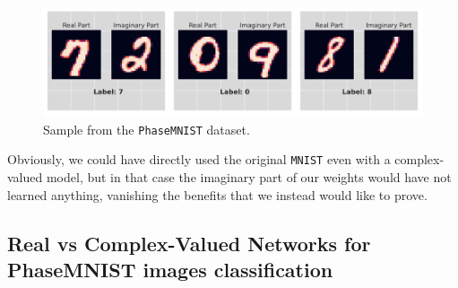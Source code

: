 \documentclass[../main.tex]{subfiles}
\begin{document}
\begin{figure}[!ht]
	\centering
	\includegraphics[width=\textwidth]{pictures/phasemnist_example}
	\caption{Sample from the \texttt{PhaseMNIST} dataset.}
	\label{fig:phasemnist_example}
\end{figure}
Obviously, we could have directly used the original \texttt{MNIST} even with a complex-valued model, but in that case the imaginary part of our weights would have not learned anything, vanishing the benefits that we instead would like to prove.


\subsection*{Real vs Complex-Valued Networks for PhaseMNIST images classification}
\end{document}
